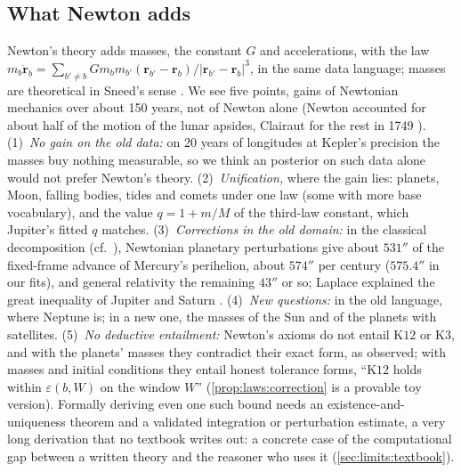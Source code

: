 \subsection{What Newton adds}\label{sec:kepler:newton}

Newton's theory adds masses, the constant $G$ and accelerations, with the law $m_b\ddot{\mathbf r}_b=\sum_{b'\ne b}Gm_bm_{b'}(\mathbf r_{b'}-\mathbf r_b)/\lvert\mathbf r_{b'}-\mathbf r_b\rvert^3$, in the same data language; masses are theoretical in Sneed's sense \citep{sneed1971logical,balzer1987architectonic}. We see five points, gains of Newtonian mechanics over about 150 years, not of Newton alone (Newton accounted for about half of the motion of the lunar apsides, Clairaut for the rest in 1749 \citep{nauenberg2015reception,bodenmann2010battle}). (1)~\emph{No gain on the old data:} on 20 years of longitudes at Kepler's precision the masses buy nothing measurable, so we think an \SAIabbr posterior on such data alone would not prefer Newton's theory. (2)~\emph{Unification,} where the gain lies: planets, Moon, falling bodies, tides and comets under one law (some with more base vocabulary), and the value $q=1+m/M$ of the third-law constant, which Jupiter's fitted $q$ matches. (3)~\emph{Corrections in the old domain:} in the classical decomposition (cf.\ \citealp{clemence1947relativity}), Newtonian planetary perturbations give about $531''$ of the fixed-frame advance of Mercury's perihelion, about $574''$ per century ($575.4''$ in our fits), and general relativity the remaining $43''$ or so; Laplace explained the great inequality of Jupiter and Saturn \citep{wilson1985great}. (4)~\emph{New questions:} in the old language, where Neptune is; in a new one, the masses of the Sun and of the planets with satellites. (5)~\emph{No deductive entailment:} Newton's axioms do not entail $\mathrm{K12}$ or $\mathrm{K3}$, and with the planets' masses they contradict their exact form, as \citet{duhem1954aim} observed; with masses and initial conditions they entail honest tolerance forms, ``$\mathrm{K12}$ holds within $\varepsilon(b,W)$ on the window $W$'' (\cref{prop:laws:correction} is a provable toy version). Formally deriving even one such bound needs an existence-and-uniqueness theorem and a validated integration or perturbation estimate, a very long derivation that no textbook writes out: a concrete case of the computational gap between a written theory and the reasoner who uses it (\cref{sec:limits:textbook}).
